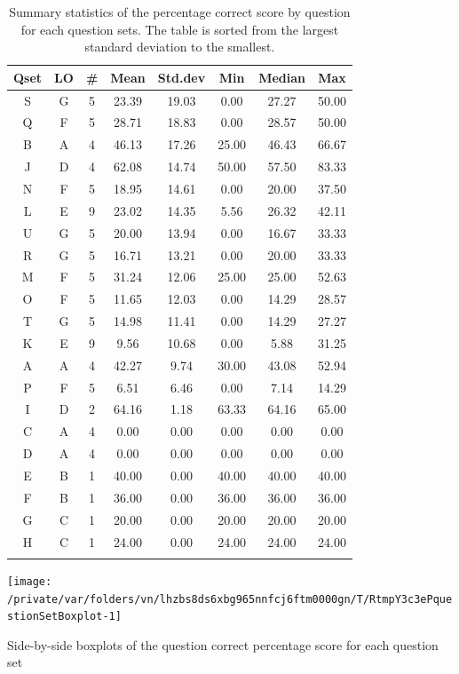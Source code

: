 \documentclass[12pt,english,nohyper]{tufte-handout}\usepackage[]{graphicx}\usepackage[]{color}
\newenvironment{knitrout}{}{} %
\begin{document}
\begin{longtable}{cc|ccc|ccc}
  \hline
Qset & LO & \# & Mean & Std.dev & Min & Median & Max \\ 
  \hline
S & G &   5 & 23.39 & 19.03 & 0.00 & 27.27 & 50.00 \\ 
  Q & F &   5 & 28.71 & 18.83 & 0.00 & 28.57 & 50.00 \\ 
  B & A &   4 & 46.13 & 17.26 & 25.00 & 46.43 & 66.67 \\ 
  J & D &   4 & 62.08 & 14.74 & 50.00 & 57.50 & 83.33 \\ 
  N & F &   5 & 18.95 & 14.61 & 0.00 & 20.00 & 37.50 \\ 
  L & E &   9 & 23.02 & 14.35 & 5.56 & 26.32 & 42.11 \\ 
  U & G &   5 & 20.00 & 13.94 & 0.00 & 16.67 & 33.33 \\ 
  R & G &   5 & 16.71 & 13.21 & 0.00 & 20.00 & 33.33 \\ 
  M & F &   5 & 31.24 & 12.06 & 25.00 & 25.00 & 52.63 \\ 
  O & F &   5 & 11.65 & 12.03 & 0.00 & 14.29 & 28.57 \\ 
  T & G &   5 & 14.98 & 11.41 & 0.00 & 14.29 & 27.27 \\ 
  K & E &   9 & 9.56 & 10.68 & 0.00 & 5.88 & 31.25 \\ 
  A & A &   4 & 42.27 & 9.74 & 30.00 & 43.08 & 52.94 \\ 
  P & F &   5 & 6.51 & 6.46 & 0.00 & 7.14 & 14.29 \\ 
  I & D &   2 & 64.16 & 1.18 & 63.33 & 64.16 & 65.00 \\ 
  C & A &   4 & 0.00 & 0.00 & 0.00 & 0.00 & 0.00 \\ 
  D & A &   4 & 0.00 & 0.00 & 0.00 & 0.00 & 0.00 \\ 
  E & B &   1 & 40.00 & 0.00 & 40.00 & 40.00 & 40.00 \\ 
  F & B &   1 & 36.00 & 0.00 & 36.00 & 36.00 & 36.00 \\ 
  G & C &   1 & 20.00 & 0.00 & 20.00 & 20.00 & 20.00 \\ 
  H & C &   1 & 24.00 & 0.00 & 24.00 & 24.00 & 24.00 \\ 
   \hline
\hline
\caption{Summary statistics of the percentage correct score by question for each question sets. The table is sorted from the largest standard deviation to the smallest.} 
\label{tab:QuestionSet_summary}
\end{longtable}


\begin{knitrout}
\color{fgcolor}\begin{marginfigure}

{\centering \texttt{[image: /private/var/folders/vn/lhzbs8ds6xbg965nnfcj6ftm0000gn/T/RtmpY3c3ePquestionSetBoxplot-1]} 

}

\caption[Side-by-side boxplots of the question correct percentage score for each question set]{Side-by-side boxplots of the question correct percentage score for each question set}\label{fig:questionSetBoxplot}
\end{marginfigure}


\end{knitrout}
\end{document}
